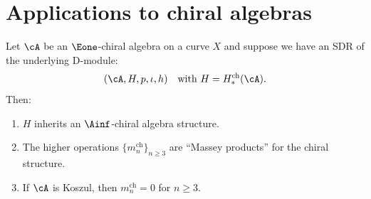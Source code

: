 \section{Applications to chiral algebras}
\label{sec:htt-chiral}


\begin{theorem}
\label{thm:chiral-htt}
Let $\cA$ be an $\Eone$-chiral algebra on a curve $X$ and suppose we have an
SDR of the underlying D-module:
\[
(\cA, H, p, \iota, h) \quad \text{with } H = H^{\mathrm{ch}}_*(\cA).
\]
Then:
\begin{enumerate}[label=(\roman*)]
\item $H$ inherits an $\Ainf$-chiral algebra structure.
\item The higher operations $\{m_n^{\mathrm{ch}}\}_{n \geq 3}$ are ``Massey products''
for the chiral structure.
\item If $\cA$ is Koszul, then $m_n^{\mathrm{ch}} = 0$ for $n \geq 3$.
\end{enumerate}
\end{theorem}

